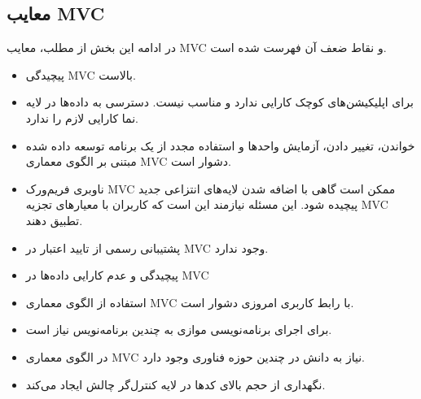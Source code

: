 \subsection{معایب MVC}
در ادامه این بخش از مطلب، معایب MVC و نقاط ضعف آن فهرست شده است.
\begin{itemize}
	\item
	پیچیدگی MVC بالاست.
	\item
	برای اپلیکیشن‌های کوچک کارایی ندارد و مناسب نیست.
	دسترسی به داده‌ها در لایه نما کارایی لازم را ندارد.
	\item
	خواندن، تغییر دادن، آزمایش واحدها و استفاده مجدد از یک برنامه توسعه داده شده مبتنی بر الگوی معماری MVC دشوار است.
	\item
	ناوبری فریم‌ورک MVC ممکن است گاهی با اضافه شدن لایه‌های انتزاعی جدید پیچیده شود. این مسئله نیازمند این است که کاربران با معیارهای تجزیه MVC تطبیق دهند.
	\item
	پشتیبانی رسمی از تایید اعتبار در MVC وجود ندارد.
	\item
	پیچیدگی و عدم کارایی داده‌ها در MVC
	\item
	استفاده از الگوی معماری MVC با رابط کاربری امروزی دشوار است.
	\item
	برای اجرای برنامه‌نویسی موازی به چندین برنامه‌نویس نیاز است.
	\item
	در الگوی معماری MVC نیاز به دانش در چندین حوزه فناوری وجود دارد.
	\item
	نگهداری از حجم بالای کدها در لایه کنترل‌گر چالش ایجاد می‌کند.
\end{itemize}


